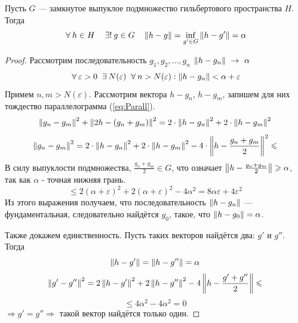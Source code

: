 \documentclass[12pt]{article}
\begin{document}
			\begin{theorem}
				Пусть $G$ --- замкнутое выпуклое подмножество гильбертового пространства $H$. Тогда
				$$\forall h \in H \quad \existsonly g \in G \quad \norm{h-g} = \underset{g' \in G}{\inf} \norm{h-g'} = \alpha$$
			\end{theorem}
			\begin{proof}
				Рассмотрим последовательность $g_1, g_2, ..., g_n$ $\left\| h - g_n \right\|~\rightarrow~\alpha$
				$$\forall \varepsilon > 0 ~ \exists N(\varepsilon) ~ \forall n > N(\varepsilon): \norm{h - g_n} < \alpha + \varepsilon$$
				Примем $n, m > N(\varepsilon)$. Рассмотрим вектора $h - g_n$, $h - g_m$, запишем для них тождество параллелограмма 
				(\ref{eq:Parall}).
				$$\left\| g_n - g_m \right\|^2 + \left\| 2h - (g_n + g_m) \right\|^2 = 2 \cdot \left\| h - g_n \right\|^2 + 2 \cdot \left\| h - g_m \right\|^2$$
				$$\left\| g_n - g_m \right\|^2 = 2 \cdot \left\| h - g_n \right\|^2 + 2 \cdot \left\| h - g_m \right\|^2 - 4 \cdot \left\| h - \frac{g_n + g_m}{2} \right\|^2 \leqslant$$
				В силу выпуклости подмножества, $\frac{g_n + g_m}{2} \in G$, что означает $\left\| h - \frac{g_n + g_m}{2} \right\| \geqslant \alpha$, так
				как $\alpha$ - точная нижняя грань.
				$$\leq 2 (\alpha + \varepsilon)^2 + 2 (\alpha + \varepsilon)^2 - 4 \alpha^2 = 8 \alpha \varepsilon + 4 \varepsilon^2$$
				Из этого выражения получаем, что последовательность $\left\| h - g_n \right\|$ --- фундаментальная, следовательно найдётся $g_0$, 
				такое, что $\left\| h - g_0 \right\| = \alpha$.
		
				Также докажем единственность. Пусть таких векторов найдётся два: $g'$ и $g''$. Тогда
				$$\left\| h - g' \right\| = \left\| h - g'' \right\| = \alpha$$
				$$\left\| g' - g'' \right\|^2 = 2 \left\| h - g' \right\|^2 + 2 \left\| h - g'' \right\|^2 - 4 \left\| h - \frac{g' + g''}{2} \right\| \leqslant$$
				$$\leq 4 \alpha^2 - 4 \alpha^2 = 0$$
				$\Rightarrow g' = g'' \Rightarrow$ такой вектор найдётся только один.
			\end{proof}

\end{document}
